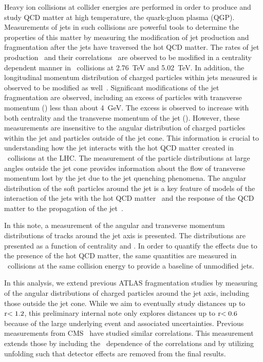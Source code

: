 
Heavy ion collisions at collider energies are performed in order to produce
and study QCD matter at high temperature, the quark-gluon plasma (QGP).  
Measurements of jets in such 
collisions are powerful tools to determine the properties of this matter
by measuring the modification of jet production and fragmentation 
after the jets have traversed the hot QCD matter.
The rates of jet production~\cite{Abelev:2013kqa,Aad:2014bxa,Khachatryan:2016odn} and their correlations~\cite{Aad:2010bu}
are observed to be modified in a centrality dependent manner in \PbPb\ collisions at
2.76~TeV and 5.02~TeV\cite{ATLAS:2017wvp}.
In addition, the longitudinal momentum
 distribution of charged particles within jets measured is observed to be modified as 
well~\cite{Aad:2014wha,Chatrchyan:2014ava, Aaboud:2017bzv,PbPb5TeVIntNote}.
Significant modifications of the jet fragmentation are observed, including an
excess of particles with transverse momentum (\pT) less than about 4~GeV.  The excess
is observed to increase with both centrality and the transverse momentum of the jet (\pTjet).
However, these measurements are insensitive to the angular distribution of charged
particles within the jet and particles outside of the jet cone.  This information
is crucial to understanding how the jet interacts with the hot QCD matter
created in \pbpb\ collisions at the LHC. The measurement of the particle distributions at large angles outside the jet cone provides information about the flow of transverse momentum lost by the jet due to the jet quenching phenomena. The angular distribution of the soft particles around the jet is
a key feature of models of the interaction of the jets with the
hot QCD matter~\cite{Blaizot:2014ula,Brewer:2017fqy} and the
response of the QCD matter to the propagation of the jet~\cite{Tachibana:2017syd,Yan:2017rku}.

In this note, a measurement of the angular and transverse momentum distributions of tracks around the jet
axis is presented.  The distributions are presented as a function of centrality
and \pTjet.  In order to quantify the effects due to the presence of the hot
QCD matter, the same quantities are measured in \pp\ collisions at the same collision 
energy to provide a baseline of unmodified jets.

In this analysis, we extend previous ATLAS fragmentation studies by measuring of the angular distributions of
charged particles around the jet axis, including those outside the jet cone. While we aim to eventually study distances up to $\rvar < 1.2$, this preliminary internal note only explores distances up to $\rvar < 0.6$ because of the large underlying event and associated uncertainties.
Previous measurements from CMS~\cite{Khachatryan:2016tfj,CMSPASHIN16020}
have studied similar correlations.  This measurement extends those
by including the \pTjet\ dependence of the correlations and
by utilizing unfolding such that detector effects are removed from the final results.



